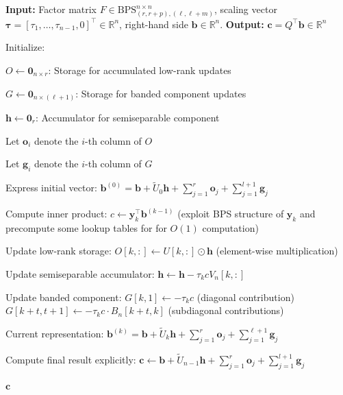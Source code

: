 \documentclass[a4paper,fleqn]{cas-sc}
\def\bfy{{\mathbf y}}
\begin{document}
\begin{algorithm}
\caption{Fast Application of \( Q^\top \) to a Vector}\label{algo_applyQ}
\begin{algorithmic}
\State \textbf{Input:} Factor matrix $F \in {\mathrm{BPS}}_{(r,r+p),(\ell,\ell+m)}^{n \times n}$, scaling vector \( \boldsymbol{\tau} = [\tau_1, \ldots, \tau_{n-1},0]^\top \in \mathbb{R}^{n} \), right-hand side \( \mathbf{b} \in \mathbb{R}^n \).
\State \textbf{Output:} \( \mathbf{c} = Q^\top\mathbf{b} \in \mathbb{R}^n \)

\State Initialize:

\( O \gets \mathbf{0}_{n \times r} \): Storage for accumulated low-rank updates

\( G \gets \mathbf{0}_{n \times (\ell+1)} \): Storage for banded component updates

\( \mathbf{h} \gets \mathbf{0}_r \): Accumulator for semiseparable component

Let \( \mathbf{o}_i \) denote the \( i \)-th column of \( O \)

Let \( \mathbf{g}_i \) denote the \( i \)-th column of \( G \)


\State Express initial vector: \( \mathbf{b}^{(0)} = \mathbf{b} + \tilde U_0 \mathbf{h} + \sum_{j=1}^r \mathbf{o}_j + \sum_{j=1}^{l+1} \mathbf{g}_j \)

    \State Compute inner product: \( c \gets \bfy_k^\top \mathbf{b}^{(k-1)} \) (exploit BPS structure of \( \bfy_k \) and precompute some lookup tables for for \( O(1) \) computation)

    \State Update low-rank storage: \( O[k,:] \gets U[k,:] \odot \mathbf{h} \) (element-wise multiplication)

    \State Update semiseparable accumulator: \( \mathbf{h} \gets \mathbf{h} - \tau_k c V_n[k,:] \)

    \State Update banded component:
    \State \( G[k,1] \gets -\tau_k c \) (diagonal contribution)
        \State \( G[k+t,t+1] \gets -\tau_k c \cdot B_n[k+t,k] \) (subdiagonal contributions)
    \EndFor

    \State Current representation: \( \mathbf{b}^{(k)} = \mathbf{b} + \tilde U_k \mathbf{h} + \sum_{j=1}^r \mathbf{o}_j + \sum_{j=1}^{\ell+1} \mathbf{g}_j \)
\EndFor

\State Compute final result explicitly: \( \mathbf{c} \gets \mathbf{b} + \tilde U_{n-1} \mathbf{h} + \sum_{j=1}^r \mathbf{o}_j + \sum_{j=1}^{l+1} \mathbf{g}_j \)

\State \Return \( \mathbf{c} \)
\end{algorithmic}
\end{algorithm}
\end{document}
